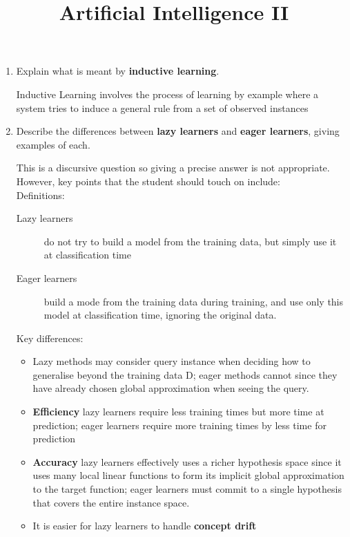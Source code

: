 \documentclass[solution]{ditpaper}
\title{Artificial Intelligence II}
\begin{document}

\question
\begin{enumerate}
	\item Explain what is meant by \textbf{inductive learning}.
	\begin{answer}
		Inductive Learning involves the process of learning by example where a system tries to induce a general rule from a set of observed instances
	\end{answer}
\item Describe the differences between \textbf{lazy learners} and \textbf{eager learners}, giving examples of each.
		\begin{answer}
This is a discursive question so giving a precise answer is not appropriate. However, key points that the student should touch on include:\\
			Definitions:
			\begin{description}
				\item [Lazy learners] do not try to build a model from the training data, but simply use it at classification time
				\item [Eager learners] build a mode from the training data during training, and use only this model at classification time, ignoring the original data.
			\end{description}
			Key differences:
			\begin{itemize}
				\item Lazy methods may consider query instance when deciding how to generalise beyond the training data D; eager methods cannot since they have already chosen global approximation when seeing the query.
				\item \textbf{Efficiency} lazy learners require less training times but more time at prediction; eager learners require more training times by less time for prediction
				\item \textbf{Accuracy} lazy learners effectively uses a richer hypothesis space since it uses many local linear functions to form its implicit global approximation to the target function; eager learners must commit to a single hypothesis that covers the entire instance space.
				\item It is easier for lazy learners to handle \textbf{concept drift}
			\end{itemize}

\end{answer}
\end{enumerate}
\end{document}
